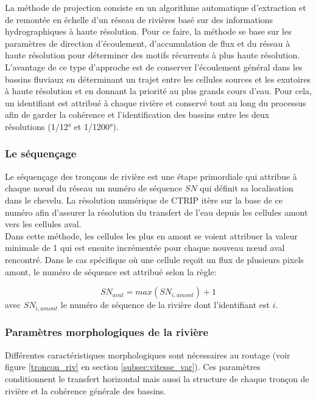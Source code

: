 La méthode de projection consiste en un algorithme automatique d'extraction et de remontée en échelle d'un réseau de rivières basé sur des informations hydrographiques à haute résolution. Pour ce faire, la méthode se base sur les paramètres de direction d'écoulement, d'accumulation de flux et du réseau à haute résolution pour déterminer des motifs récurrents à plus haute résolution. L'avantage de ce type d'approche est de conserver l'écoulement général dans les bassins fluviaux en déterminant un trajet entre les cellules sources et les exutoires à haute résolution et en donnant la priorité au plus grands cours d'eau. Pour cela, un identifiant est attribué à chaque rivière et conservé tout au long du processus afin de garder la cohérence et l'identification des bassins entre les deux résolutions (1/12° et 1/1200°).

\subsubsection{\selectfont Le séquençage}

Le séquençage des tronçons de rivière est une étape primordiale qui attribue à chaque nœud du réseau un numéro de séquence $SN$ qui définit sa localisation dans le chevelu. La résolution numérique de CTRIP itère sur la base de ce numéro afin d'assurer la résolution du transfert de l'eau depuis les cellules amont vers les cellules aval.\\
Dans cette méthode, les cellules les plus en amont se voient attribuer la valeur minimale de 1 qui est ensuite incrémentée pour chaque nouveau nœud aval rencontré. Dans le cas spécifique où une cellule reçoit un flux de plusieurs pixels amont, le numéro de séquence est attribué selon la règle:

\begin{equation}\label{eq:SN}
SN_{aval} = max(SN_{i,amont}) + 1
\end{equation}
avec $SN_{i,amont}$ le numéro de séquence de la rivière dont l'identifiant est $i$.

\subsubsection{\selectfont Paramètres morphologiques de la rivière}
\label{subsec:param_riv}

Différentes caractéristiques morphologiques sont nécessaires au routage (voir figure \ref{troncon_riv} en section \ref{subsec:vitesse_var}). Ces paramètres conditionnent le transfert horizontal mais aussi la structure de chaque tronçon de rivière et la cohérence générale des bassins. \\

